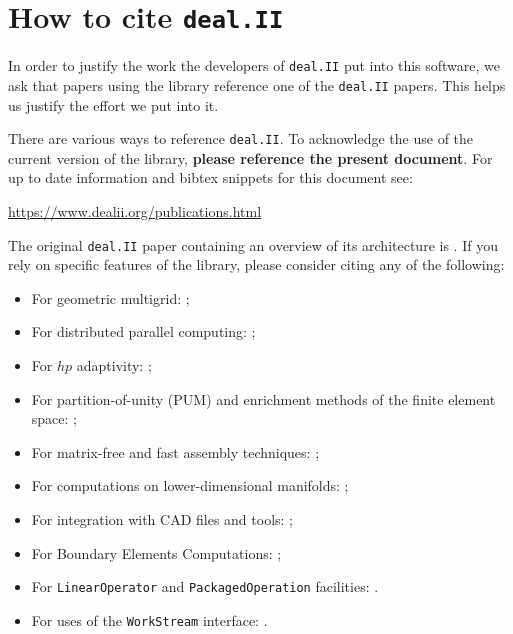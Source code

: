 \documentclass{ansarticle-preprint}
\newcommand{\specialword}[1]{\texttt{#1}}
\newcommand{\dealii}{{\specialword{deal.II}}\xspace}
\begin{document}
\section{How to cite \dealii}\label{sec:cite}

In order to justify the work the developers of \dealii put into this
software, we ask that papers using the library reference one of the
\dealii papers. This helps us justify the effort we put into it.

There are various ways to reference \dealii. To acknowledge the use of
the current version of the library, \textbf{please reference the present
document}. For up to date information and bibtex snippets for this document
see:
\begin{center}
 \url{https://www.dealii.org/publications.html}
\end{center}

The original \texttt{\dealii} paper containing an overview of its
architecture is \cite{BangerthHartmannKanschat2007}. If you rely on
specific features of the library, please consider citing any of the
following:
\begin{itemize}
 \item For geometric multigrid: \cite{Kanschat2004,JanssenKanschat2011,ClevengerHeisterKanschatKronbichler2019};
 \item For distributed parallel computing: \cite{BangerthBursteddeHeisterKronbichler11};
 \item For $hp$ adaptivity: \cite{BangerthKayserHerold2007};
  \item For partition-of-unity (PUM) and enrichment methods of the
    finite element space: \cite{Davydov2016};
 \item For matrix-free and fast assembly techniques:
   \cite{KronbichlerKormann2012,KronbichlerKormann2019};
 \item For computations on lower-dimensional manifolds:
   \cite{DeSimoneHeltaiManigrasso2009};
 \item For integration with CAD files and tools:
   \cite{HeltaiMola2015};
 \item For Boundary Elements Computations:
   \cite{GiulianiMolaHeltai-2018-a};
 \item For \texttt{LinearOperator} and \texttt{PackagedOperation} facilities:
   \cite{MaierBardelloniHeltai-2016-a,MaierBardelloniHeltai-2016-b}.
 \item For uses of the \texttt{WorkStream} interface:
   \cite{TKB16}.
\end{itemize}
\end{document}
